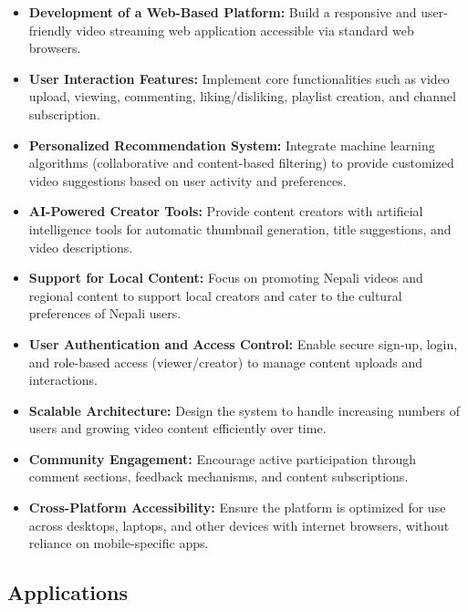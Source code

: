\begin{itemize}[leftmargin=2cm]
  \item \textbf{Development of a Web-Based Platform:} Build a responsive and user-friendly video streaming web application accessible via standard web browsers.

  \item \textbf{User Interaction Features:} Implement core functionalities such as video upload, viewing, commenting, liking/disliking, playlist creation, and channel subscription.

  \item \textbf{Personalized Recommendation System:} Integrate machine learning algorithms (collaborative and content-based filtering) to provide customized video suggestions based on user activity and preferences.

  \item \textbf{AI-Powered Creator Tools:} Provide content creators with artificial intelligence tools for automatic thumbnail generation, title suggestions, and video descriptions.

  \item \textbf{Support for Local Content:} Focus on promoting Nepali videos and regional content to support local creators and cater to the cultural preferences of Nepali users.

  \item \textbf{User Authentication and Access Control:} Enable secure sign-up, login, and role-based access (viewer/creator) to manage content uploads and interactions.

  \item \textbf{Scalable Architecture:} Design the system to handle increasing numbers of users and growing video content efficiently over time.

  \item \textbf{Community Engagement:} Encourage active participation through comment sections, feedback mechanisms, and content subscriptions.

  \item \textbf{Cross-Platform Accessibility:} Ensure the platform is optimized for use across desktops, laptops, and other devices with internet browsers, without reliance on mobile-specific apps.
\end{itemize}

\subsection{Applications}

